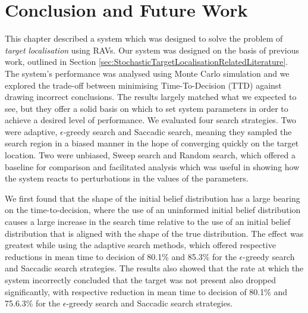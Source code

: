 \section{Conclusion and Future Work}


This chapter described a system which was designed to solve the problem of \textit{target localisation} using RAVs. Our system was designed on the basis of previous work, outlined in Section \ref{sec:StochasticTargetLocalisationRelatedLiterature}. The system's performance was analysed using Monte Carlo simulation and we explored the trade-off between minimising Time-To-Decision (TTD) against drawing incorrect conclusions. The results largely matched what we expected to see, but they offer a solid basis on which to set system parameters in order to achieve a desired level of performance. We evaluated four search strategies. Two were adaptive, $\epsilon$-greedy search and Saccadic search, meaning they sampled the search region in a biased manner in the hope of converging quickly on the target location. Two were unbiased, Sweep search and Random search, which offered a baseline for comparison and facilitated analysis which was useful in showing how the system reacts to perturbations in the values of the parameters.

We first found that the shape of the initial belief distribution has a large bearing on the time-to-decision, where the use of an uninformed initial belief distribution causes a large increase in the search time relative to the use of an initial belief distribution that is aligned with the shape of the true distribution. The effect was greatest while using the adaptive search methods, which offered respective reductions in mean time to decision of 80.1\% and 85.3\% for the $\epsilon$-greedy search and Saccadic search strategies. The results also showed that the rate at which the system incorrectly concluded that the target was not present also dropped significantly, with respective reduction in mean time to decision of 80.1\% and 75.6.3\% for the $\epsilon$-greedy search and Saccadic search strategies. \par


